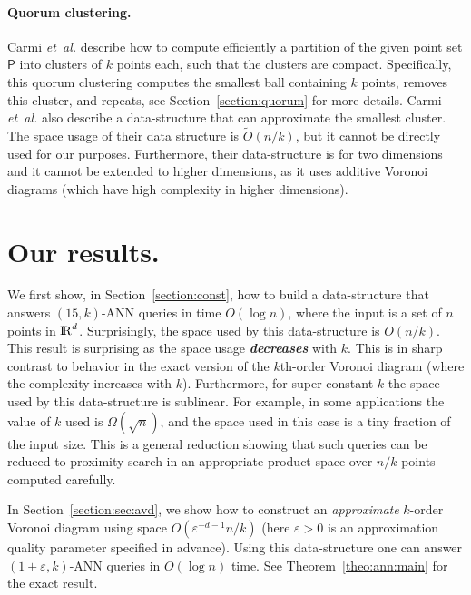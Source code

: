 \documentclass[12pt]{article}
\makeatletter
\newcommand{\emphic}[2]{\textcolor{blue25}{\textbf{\emph{#1}}}\index{#2}}
\newcommand{\emphi}[1]{\emphic{#1}{#1}}
\newcommand{\Term}[1]{\textsf{#1}}
\newcommand{\TermI}[1]{\Term{#1}\index{#1@\Term{#1}}}
\theoremstyle{remark}{\theorembodyfont{\rm} \newtheorem{remark}[theorem]{Remark}}
\newcommand{\thmref}[1]{Theorem~\ref{theo:#1}}
\newcommand{\secref}[1]{Section~\ref{section:#1}}
\newcommand{\pth}[2][\!]{#1\left({#2}\right)}
\newcommand{\eps}{{\varepsilon}}\newcommand{\divides}{|}
\newcommand{\ANN}{\TermI{ANN}\xspace}
\newcommand{\etal}{\textit{et~al.}\xspace}
\renewcommand{\Re}{{\rm I\!\hspace{-0.025em} R}}
\newcommand{\PntSet}{\mathsf{P}}
\renewcommand{\th}{th\xspace}
\newcommand{\Otilde}{\widetilde{O}}
\makeatother
\begin{document}
\paragraph{Quorum clustering.}
Carmi \etal \cite{cdhks-gqsa-05} describe how to compute efficiently a
partition of the given point set $\PntSet$ into clusters of $k$ points each,
such that the clusters are compact. Specifically, this quorum clustering
computes the smallest ball containing $k$ points, removes
this cluster, and repeats, see \secref{quorum} for more details. Carmi
\etal \cite{cdhks-gqsa-05} also describe a data-structure that can
approximate the smallest cluster. The space usage of their data structure is
$\Otilde(n /k)$, but it cannot be directly used for our
purposes. Furthermore, their data-structure is for two dimensions and
it cannot be extended to higher dimensions, as it uses additive
Voronoi diagrams (which have high complexity in higher dimensions).




\section*{Our results.}

We first show, in \secref{const}, how to build a data-structure
that answers $(15,k)$-\ANN queries in time $O( \log n)$, 
where the input is a
set of $n$ points in $\Re^d$. Surprisingly, the space used by this
data-structure is $O(n/k)$.  This result is surprising as the
space usage \emphi{decreases} with $k$. This is in sharp contrast to
behavior in the exact version of the $k$\th-order Voronoi diagram
(where the complexity increases with $k$). Furthermore, for
super-constant $k$ the space used by this data-structure is
sublinear. For example, in some applications the value of $k$ used is
$\Omega\pth{ \sqrt{n}}$, and the space used in this case is a tiny
fraction of the input size.  This is a general reduction showing that
such queries can be reduced to proximity search in an appropriate
product space over $n/k$ points computed carefully.

In \secref{sec:avd}, we show how to construct an \emph{approximate}
$k$-order Voronoi diagram using space $O(\eps^{-d-1} n/k)$ (here
$\eps>0$ is an approximation quality parameter specified in
advance). Using this data-structure one can answer
$(1+\eps,k)$-\ANN queries in $O(\log n)$
time. See \thmref{ann:main} for the exact result.
\end{document}
